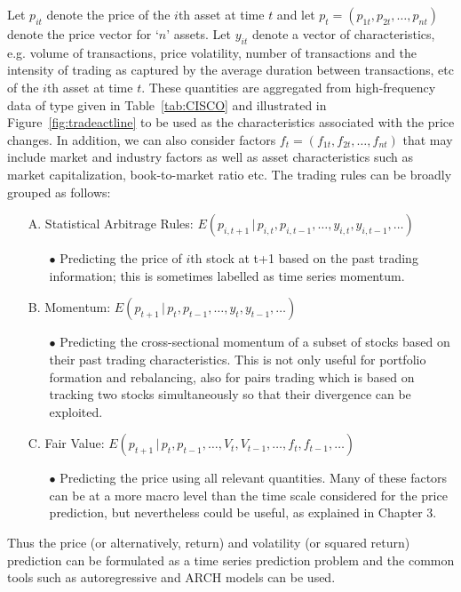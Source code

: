 Let $p_{it}$ denote the price of the $i$th asset at time $t$ and let $p_t = (p_{1t},p_{2t},\ldots,p_{nt})$ denote the price vector for `$n$' assets. Let $y_{it}$ denote a vector of characteristics, e.g. volume of transactions, price volatility, number of transactions and the intensity of trading as captured by the average duration between transactions, etc of the $i$th asset at time $t$. These quantities are aggregated from high-frequency data of type given in Table~\ref{tab:CISCO} and illustrated in Figure~\ref{fig:tradeactline} to be used as the characteristics associated with the price changes. In addition, we can also consider factors $f_t = (f_{1t},f_{2t},\ldots,f_{nt})$ that may include market and industry factors as well as asset characteristics such as market capitalization, book-to-market ratio etc. The trading rules can be broadly grouped as follows:
\begin{itemize}
\item[A.] Statistical Arbitrage Rules: $E(p_{i,t+1}\,|\,p_{i,t},p_{i,t-1},\ldots,y_{i,t},y_{i,t-1},\ldots)$
\begin{itemize}
\item[$\bullet$] Predicting the price of $i$th stock at t+1 based on the past trading information; this is sometimes labelled as time series momentum.
\end{itemize}
\item[B.] Momentum: $E(p_{t+1}\,|\,p_{t},p_{t-1},\ldots,y_{t},y_{t-1},\ldots)$
\begin{itemize}
\item[$\bullet$] Predicting the cross-sectional momentum of a subset of stocks based on their past trading characteristics. This is not only useful for portfolio formation and rebalancing, also for pairs trading which is based on tracking two stocks simultaneously so that their divergence can be exploited. 
\end{itemize}
\item[C.] Fair Value: $E(p_{t+1}\,|\,p_{t},p_{t-1},\ldots,V_{t},V_{t-1},\ldots,f_t,f_{t-1},\ldots)$
\begin{itemize}
\item[$\bullet$] Predicting the price using all relevant quantities. Many of these factors can be at a more macro level than the time scale considered for the price prediction, but nevertheless could be useful, as explained in Chapter 3.
\end{itemize}
\end{itemize}
\noindent Thus the price (or alternatively, return) and volatility (or squared return) prediction can be formulated as a time series prediction problem and the common tools such as autoregressive and ARCH models can be used. 


